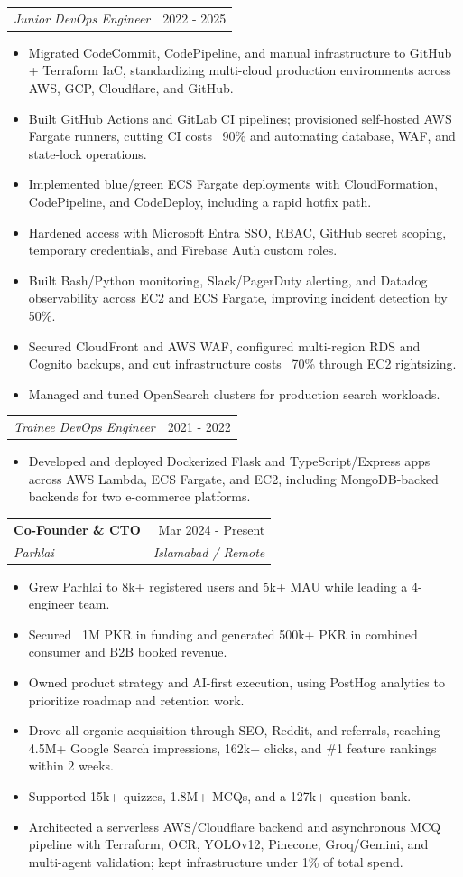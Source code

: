\documentclass[letterpaper,10pt]{article}
\makeatletter
\newcommand{\resumeItem}[1]{
  \item\small{{#1 \vspace{-3pt}}}
}
\newcommand{\resumeSubheading}[4]{
  \vspace{-4pt}\item
  \begin{tabular*}{0.97\textwidth}[t]{l@{\extracolsep{\fill}}r}
    \small\textbf{#1} & #2 \\
    \textit{\small#3} & \textit{\small #4} \\
  \end{tabular*}\vspace{-7pt}
}
\newcommand{\resumeRoleHeadingSecondary}[2]{
  \vspace{-5pt}\item[\mbox{}]
  \begin{tabular*}{0.97\textwidth}[t]{l@{\extracolsep{\fill}}r}
    \footnotesize\textit{#1} & \footnotesize #2 \\
  \end{tabular*}\vspace{-8pt}
}
\newcommand{\resumeItemListStart}{\begin{itemize}}
\newcommand{\resumeItemListEnd}{\end{itemize}\vspace{-7pt}}
\makeatother
\begin{document}
\resumeRoleHeadingSecondary
{Junior DevOps Engineer}{2022 - 2025}
\resumeItemListStart
\resumeItem{Migrated CodeCommit, CodePipeline, and manual infrastructure to GitHub + Terraform IaC, standardizing multi-cloud production environments across AWS, GCP, Cloudflare, and GitHub.}
\resumeItem{Built GitHub Actions and GitLab CI pipelines; provisioned self-hosted AWS Fargate runners, cutting CI costs ~90\% and automating database, WAF, and state-lock operations.}
\resumeItem{Implemented blue/green ECS Fargate deployments with CloudFormation, CodePipeline, and CodeDeploy, including a rapid hotfix path.}
\resumeItem{Hardened access with Microsoft Entra SSO, RBAC, GitHub secret scoping, temporary credentials, and Firebase Auth custom roles.}
\resumeItem{Built Bash/Python monitoring, Slack/PagerDuty alerting, and Datadog observability across EC2 and ECS Fargate, improving incident detection by 50\%.}
\resumeItem{Secured CloudFront and AWS WAF, configured multi-region RDS and Cognito backups, and cut infrastructure costs ~70\% through EC2 rightsizing.}
\resumeItem{Managed and tuned OpenSearch clusters for production search workloads.}
\resumeItemListEnd

\resumeRoleHeadingSecondary
{Trainee DevOps Engineer}{2021 - 2022}
\resumeItemListStart
\resumeItem{Developed and deployed Dockerized Flask and TypeScript/Express apps across AWS Lambda, ECS Fargate, and EC2, including MongoDB-backed backends for two e-commerce platforms.}
\resumeItemListEnd

\resumeSubheading
{Co-Founder \& CTO}{Mar 2024 - Present}
{Parhlai}{Islamabad / Remote}
\resumeItemListStart
\resumeItem{Grew Parhlai to 8k+ registered users and 5k+ MAU while leading a 4-engineer team.}
\resumeItem{Secured ~1M PKR in funding and generated 500k+ PKR in combined consumer and B2B booked revenue.}
\resumeItem{Owned product strategy and AI-first execution, using PostHog analytics to prioritize roadmap and retention work.}
\resumeItem{Drove all-organic acquisition through SEO, Reddit, and referrals, reaching 4.5M+ Google Search impressions, 162k+ clicks, and \#1 feature rankings within 2 weeks.}
\resumeItem{Supported 15k+ quizzes, 1.8M+ MCQs, and a 127k+ question bank.}
\resumeItem{Architected a serverless AWS/Cloudflare backend and asynchronous MCQ pipeline with Terraform, OCR, YOLOv12, Pinecone, Groq/Gemini, and multi-agent validation; kept infrastructure under 1\% of total spend.}
\resumeItemListEnd
\end{document}
